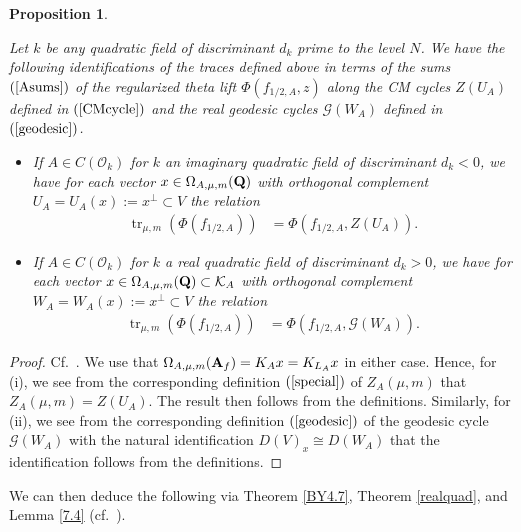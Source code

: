 \documentclass{amsart}
\newtheorem{proposition}[theorem]{Proposition}
\theoremstyle{definition}
\theoremstyle{definition}
\theoremstyle{definition}
\begin{document}
\begin{proposition}\label{traces} 

Let $k$ be any quadratic field of discriminant $d_k$ prime to the level $N$.
We have the following identifications of the traces defined above in terms of the sums $(\ref{Asums})$
of the regularized theta lift $\Phi(f_{1/2, A}, z)$ along the CM cycles $Z(U_A)$ defined in $(\ref{CMcycle})$ 
and the real geodesic cycles $\mathcal{G}(W_A)$ defined in $(\ref{geodesic})$. 

\begin{itemize}

\item[(i)] If $A \in C(\mathcal{O}_k)$ for $k$ an imaginary quadratic field of discriminant $d_k <0$, we have for each vector
$x \in \Omega_{A, \mu, m}({\bf{Q}})$ with orthogonal complement $U_A = U_A(x) := x^{\perp} \subset V$ the relation
\begin{align*} \operatorname{tr}_{\mu, m}(\Phi(f_{1/2, A})) &= \Phi(f_{1/2, A}, Z(U_A)). \end{align*}

\item[(ii)] If $A \in C(\mathcal{O}_k)$ for $k$ a real quadratic field of discriminant $d_k >0$, we have for each vector
$x \in \Omega_{A, \mu, m}({\bf{Q}}) \subset \mathcal{K}_A$ with orthogonal complement $W_A = W_A(x) := x^{\perp} \subset V$ the relation 
\begin{align*} \operatorname{tr}_{\mu, m}(\Phi(f_{1/2, A})) &= \Phi(f_{1/2, A}, \mathcal{G}(W_A)).\end{align*}

\end{itemize}

\end{proposition}

\begin{proof} Cf.~\cite[Proposition 7.2]{BY}. We use that $\Omega_{A, \mu, m}({\bf{A}}_f) = K_A x = K_{L_A} x$ in either case.  
Hence, for (i), we see from the corresponding definition $(\ref{special})$ of $Z_A(\mu, m)$ that $Z_A(\mu, m) = Z(U_A)$. 
The result then follows from the definitions. Similarly, for (ii), we see from the corresponding definition
$(\ref{geodesic})$ of the geodesic cycle $\mathcal{G}(W_A)$ with the natural identification $D(V)_x \cong D(W_A)$ that the identification follows from the definitions. \end{proof}

We can then deduce the following via Theorem \ref{BY4.7}, Theorem \ref{realquad}, and Lemma \ref{7.4} (cf.~\cite[Lemma 7.4]{BY}).
\end{document}
